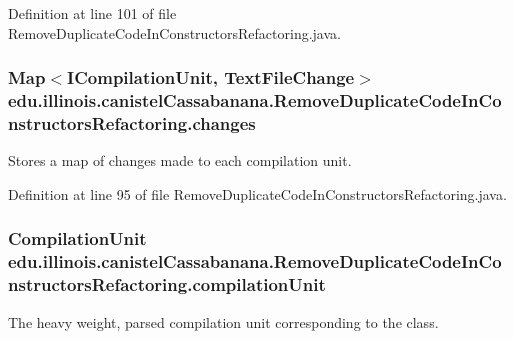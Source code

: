 Definition at line 101 of file RemoveDuplicateCodeInConstructorsRefactoring.java.

\hypertarget{classedu_1_1illinois_1_1canistelCassabanana_1_1RemoveDuplicateCodeInConstructorsRefactoring_af20942a1670a5ccd3debb4b0b10d629c}{
\subsubsection[{changes}]{\setlength{\rightskip}{0pt plus 5cm}Map$<$ICompilationUnit, TextFileChange$>$ {\bf edu.illinois.canistelCassabanana.RemoveDuplicateCodeInConstructorsRefactoring.changes}}}
\label{classedu_1_1illinois_1_1canistelCassabanana_1_1RemoveDuplicateCodeInConstructorsRefactoring_af20942a1670a5ccd3debb4b0b10d629c}
Stores a map of changes made to each compilation unit. 

Definition at line 95 of file RemoveDuplicateCodeInConstructorsRefactoring.java.

\hypertarget{classedu_1_1illinois_1_1canistelCassabanana_1_1RemoveDuplicateCodeInConstructorsRefactoring_aa307d91c3347e0f99dca03fb3789e487}{
\subsubsection[{compilationUnit}]{\setlength{\rightskip}{0pt plus 5cm}CompilationUnit {\bf edu.illinois.canistelCassabanana.RemoveDuplicateCodeInConstructorsRefactoring.compilationUnit}}}
\label{classedu_1_1illinois_1_1canistelCassabanana_1_1RemoveDuplicateCodeInConstructorsRefactoring_aa307d91c3347e0f99dca03fb3789e487}
The heavy weight, parsed compilation unit corresponding to the class. 

